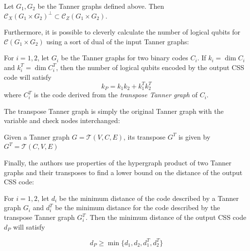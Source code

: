 \documentclass[12pt]{article}%
\theoremstyle{definition}
\begin{document}
\vspace{7pt}
\begin{theorem} \cite{tillich2013quantum}
  Let $G_1,G_2$ be the Tanner graphs defined above. Then $\mathcal{C}_X(G_1 \times G_2)^{\perp} \subset \mathcal{C}_Z(G_1 \times G_2)$. 
\end{theorem}
\vspace{5pt}

\noindent Furthermore, it is possible to cleverly calculate the number of logical qubits for $\mathcal{C}(G_1 \times G_2)$ using a sort of dual of the input Tanner graphs:

\vspace{7pt}
\begin{prop} \cite{tillich2013quantum} \label{logqbit}
  For $i = 1,2$, let $G_i$ be the Tanner graphs for two binary codes $C_i$. If $k_i = \dim{C_i}$ and $k_i^T = \dim{C_i^T}$, then the number of logical qubits encoded by the output CSS code will satisfy
\[k_P = k_1k_2 + k_1^Tk_2^T \]
where $C_i^T$ is the code derived from the \emph{transpose Tanner graph} of $C_i$.
\end{prop}
\vspace{5pt}

\noindent The transpose Tanner graph is simply the original Tanner graph with the variable and check nodes interchanged:

\vspace{7pt}
\begin{definition}
  Given a Tanner graph $G = \mathcal{T}(V, C, E)$, its transpose $G^T$ is given by $G^T = \mathcal{T}(C,V,E)$
\end{definition}
\vspace{5pt}

\noindent Finally, the authors use properties of the hypergraph product of two Tanner graphs and their transposes to find a lower bound on the distance of the output CSS code:

\vspace{7pt}
\begin{theorem} \cite{tillich2013quantum} \label{distance}
For $i = 1,2$, let $d_i$ be the minimum distance of the code described by a Tanner graph $G_i$ and $d_i^T$ be the minimum distance for the code described by the transpose Tanner graph $G_i^T$. Then the minimum distance of the output CSS code $d_P$ will satisfy

\[ d_P \geq \min \{d_1, d_2, d_1^T, d_2^T \} \]
\end{theorem}
\vspace{5pt}
\end{document}
